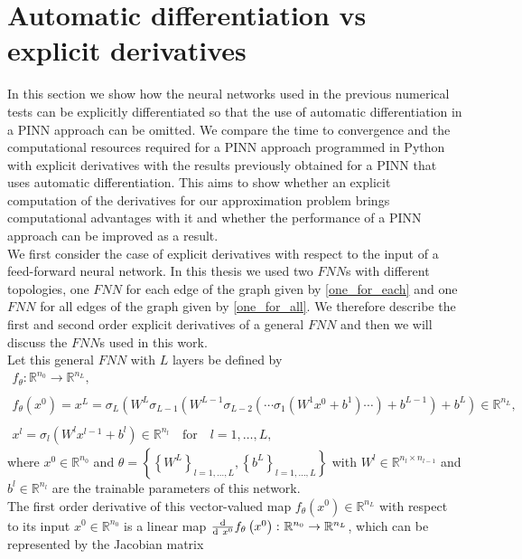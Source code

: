 \section{Automatic differentiation vs explicit derivatives}
\label{ch3:sec3}

In this section we show how the neural networks used in the previous numerical tests can be explicitly differentiated so that the use of automatic differentiation in a PINN approach can be omitted. We compare the time to convergence and the computational resources required for a PINN approach programmed in Python with explicit derivatives with the results previously obtained for a PINN that uses automatic differentiation. This aims to show whether an explicit computation of the derivatives for our approximation problem brings computational advantages with it and whether the performance of a PINN approach can be improved as a result. \\
We first consider the case of explicit derivatives with respect to the input of a feed-forward neural network. In this thesis we used two $FNN$s with different topologies, one $FNN$ for each edge of the graph given by \cref{one_for_each} and one $FNN$ for all edges of the graph given by \cref{one_for_all}. We therefore describe the first and second order explicit derivatives of a general $FNN$ and then we will discuss the $FNN$s used in this work. \\
Let this general $FNN$ with $L$ layers be defined by 
\begin{gather}
    \label{model prediction}
    f_{\theta} \colon \mathbb{R}^{n_0} \to \mathbb{R}^{n_L}, \\
    \\
    f_{\theta}\left(x^0\right) = x^L = \sigma_L\left(W^L \sigma_{L-1}\left(W^{L-1}\sigma_{L-2}\left(\cdots \sigma_{1}\left(W^{1}x^0 + b^1\right) \cdots\right) + b^{L-1}\right) + b^{L}\right) \in \mathbb{R}^{n_L}, \\
    \\
    x^l = \sigma_l\left(W^l x^{l-1} + b^l\right) \in \mathbb{R}^{n_l} \quad \text{for} \quad l = 1, \ldots, L,
\end{gather}
where $x^0 \in \mathbb{R}^{n_0}$ and $\theta = \left\{ \left\{ W^L \right\}_{l = 1, \ldots, L}, \left\{ b^L \right\}_{l = 1, \ldots, L} \right\}$ with $W^l \in \mathbb{R}^{n_l \times n_{l-1}}$ and $b^l \in \mathbb{R}^{n_l}$ are the trainable parameters of this network. \\
The first order derivative of this vector-valued map $f_{\theta}\left(x^0\right) \in \mathbb{R}^{n_L}$ with respect to its input $x^0 \in \mathbb{R}^{n_0}$ is a linear map $\frac{\textup{d}}{\textup{d} \ x^0} f_{\theta}\left(x^0\right) \colon \mathbb{R}^{n_0} \to \mathbb{R}^{n_L}$, which can be represented by the Jacobian matrix
